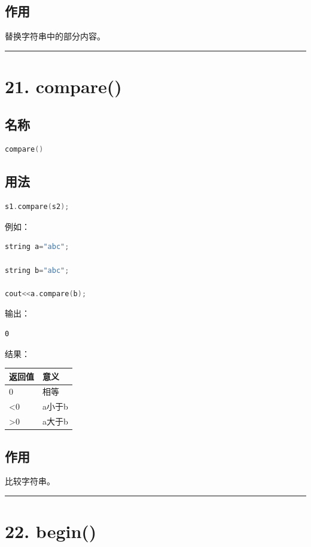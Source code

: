 \documentclass[9pt,twocolumn]{extarticle}
\begin{document}
\subsection{作用}
替换字符串中的部分内容。

\noindent\rule{\linewidth}{0.4pt}

\section{21. compare()}

\subsection{名称}
\begin{lstlisting}[language=C++]
compare()
\end{lstlisting}

\subsection{用法}
\begin{lstlisting}[language=C++]
s1.compare(s2);
\end{lstlisting}
例如：
\begin{lstlisting}[language=C++]
string a="abc";

string b="abc";

cout<<a.compare(b);
\end{lstlisting}
输出：
\begin{lstlisting}
0
\end{lstlisting}
结果：
\begin{table}[h]
\centering
\begin{tabular}{|l|l|}
\hline
返回值 & 意义 \\ \hline
0 & 相等 \\ \hline
<0 & a小于b \\ \hline
>0 & a大于b \\ \hline
\end{tabular}
\end{table}

\subsection{作用}
比较字符串。

\noindent\rule{\linewidth}{0.4pt}

\section{22. begin()}
\end{document}
